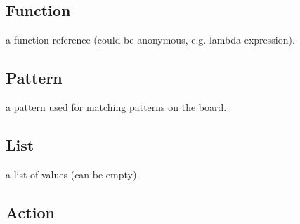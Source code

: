 \subsection{Function}
a function reference (could be anonymous, e.g. lambda expression).
\subsection{Pattern}
a pattern used for matching patterns on the board.
\subsection{List}
a list of values (can be empty).
\subsection{Action}


